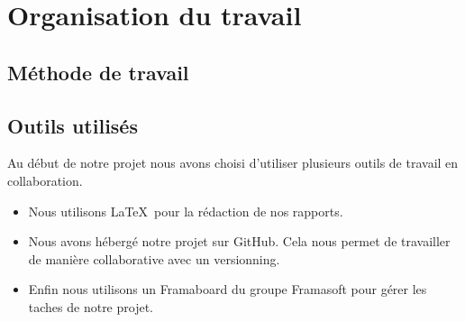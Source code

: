 
\chapter{Organisation du travail}


 \section{Méthode de travail}









\section{Outils utilisés}

Au début de notre projet nous avons choisi d'utiliser plusieurs outils de travail en collaboration.

\begin{itemize}
\item Nous utilisons \LaTeX~pour la rédaction de nos rapports.
\item Nous avons hébergé notre projet sur GitHub. Cela nous permet de travailler de manière collaborative avec un versionning.
\item Enfin nous utilisons un Framaboard du groupe Framasoft pour gérer les taches de notre projet.
\end{itemize}

